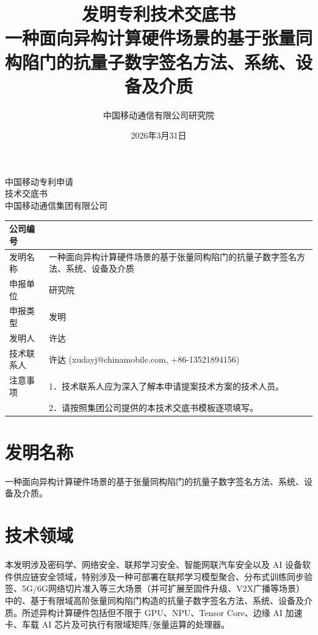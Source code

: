 \documentclass[12pt,a4paper]{article}
\title{\textbf{发明专利技术交底书} \\[0.5em]
\Large 一种面向异构计算硬件场景的基于张量同构陷门的抗量子数字签名方法、系统、设备及介质}
\author{中国移动通信有限公司研究院}
\date{2026年3月31日}
\newcommand{\heiti}{\CJKfamily{hei}}
\begin{document}
\begin{center}
    {\Large\heiti 中国移动专利申请} \\[1em]
    {\Huge\heiti 技术交底书} \\[1em]
    {\large 中国移动通信集团有限公司} \\[1em]
\end{center}

\noindent
\begin{tabular}{|p{3cm}|p{12cm}|}
\hline
公司编号 &  \\
\hline
发明名称 & 一种面向异构计算硬件场景的基于张量同构陷门的抗量子数字签名方法、系统、设备及介质 \\
\hline
申报单位 & 研究院 \\
\hline
申报类型 & 发明 \\
\hline
发明人 & 许达 \\
\hline
技术联系人 & 许达 (xudayj@chinamobile.com, +86-13521894156) \\
\hline
注意事项 & 1．技术联系人应为深入了解本申请提案技术方案的技术人员。 \\
         & 2．请按照集团公司提供的本技术交底书模板逐项填写。 \\
\hline
\end{tabular}

\vspace{1cm}

\section{发明名称}

一种面向异构计算硬件场景的基于张量同构陷门的抗量子数字签名方法、系统、设备及介质。


\section{技术领域}

本发明涉及密码学、网络安全、联邦学习安全、智能网联汽车安全以及 AI 设备软件供应链安全领域，特别涉及一种可部署在联邦学习模型聚合、分布式训练同步验签、5G/6G网络切片准入等三大场景（并可扩展至固件升级、V2X广播等场景）中的、基于有限域高阶张量同构陷门构造的抗量子数字签名方法、系统、设备及介质。所述异构计算硬件包括但不限于 GPU、NPU、Tensor Core、边缘 AI 加速卡、车载 AI 芯片及可执行有限域矩阵/张量运算的处理器。
\end{document}
